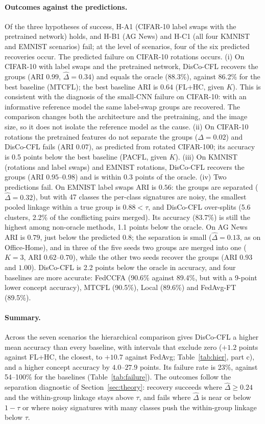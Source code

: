 \paragraph{Outcomes against the predictions.} Of the three hypotheses of success, H-A1 (CIFAR-10 label swaps with the pretrained network) holds, and H-B1 (AG News) and H-C1 (all four KMNIST and EMNIST scenarios) fail; at the level of scenarios, four of the six predicted recoveries occur. The predicted failure on CIFAR-10 rotations occurs. (i) On CIFAR-10 with label swaps and the pretrained network, DisCo-CFL recovers the groups (ARI $0.99$, $\hat\Delta=0.34$) and equals the oracle (88.3\%), against 86.2\% for the best baseline (MTCFL); the best baseline ARI is $0.64$ (FL+HC, given $K$). This is consistent with the diagnosis of the small-CNN failure on CIFAR-10: with an informative reference model the same label-swap groups are recovered. The comparison changes both the architecture and the pretraining, and the image size, so it does not isolate the reference model as the cause. (ii) On CIFAR-10 rotations the pretrained features do not separate the groups ($\hat\Delta=0.02$) and DisCo-CFL fails (ARI $0.07$), as predicted from rotated CIFAR-100; its accuracy is 0.5 points below the best baseline (PACFL, given $K$). (iii) On KMNIST (rotations and label swaps) and EMNIST rotations, DisCo-CFL recovers the groups (ARI $0.95$--$0.98$) and is within $0.3$ points of the oracle. (iv) Two predictions fail. On EMNIST label swaps ARI is $0.56$: the groups are separated ($\hat\Delta=0.32$), but with 47 classes the per-class signatures are noisy, the smallest pooled linkage within a true group is $0.88<\tau$, and DisCo-CFL over-splits (5.6 clusters, 2.2\% of the conflicting pairs merged). Its accuracy (83.7\%) is still the highest among non-oracle methods, 1.1 points below the oracle. On AG News ARI is $0.79$, just below the predicted $0.8$; the separation is small ($\hat\Delta=0.13$, as on Office-Home), and in three of the five seeds two groups are merged into one ($K=3$, ARI $0.62$--$0.70$), while the other two seeds recover the groups (ARI $0.93$ and $1.00$). DisCo-CFL is 2.2 points below the oracle in accuracy, and four baselines are more accurate: FedCCFA (90.6\% against 89.4\%, but with a 9-point lower concept accuracy), MTCFL (90.5\%), Local (89.6\%) and FedAvg-FT (89.5\%).

\paragraph{Summary.} Across the seven scenarios the hierarchical comparison gives DisCo-CFL a higher mean accuracy than every baseline, with intervals that exclude zero ($+1.2$ points against FL+HC, the closest, to $+10.7$ against FedAvg; Table~\ref{tab:hier}, part c), and a higher concept accuracy by $4.0$--$27.9$ points. Its failure rate is 23\%, against 54--100\% for the baselines (Table~\ref{tab:failure}). The outcomes follow the separation diagnostic of Section~\ref{sec:theory}: recovery succeeds where $\hat\Delta\ge0.24$ and the within-group linkage stays above $\tau$, and fails where $\hat\Delta$ is near or below $1-\tau$ or where noisy signatures with many classes push the within-group linkage below $\tau$.
